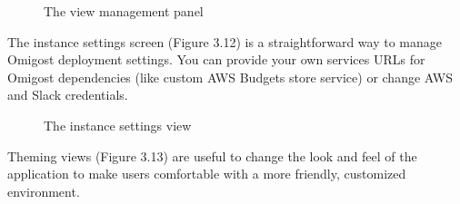 \documentclass[licencjacka,en]{thesisclass}
\begin{document}
    \begin{figure}[H]
      \caption{The view management panel\label{fig:scr-extensions}}
    \end{figure}

    The instance settings screen (Figure 3.12) is a straightforward way to manage
    Omigost deployment settings. You can provide your own services URLs for Omigost dependencies
    (like custom AWS Budgets store service) or change AWS and Slack credentials.

    \begin{figure}[H]
      \caption{The instance settings view\label{fig:scr-instance-settings}}
    \end{figure}

    Theming views (Figure 3.13) are useful to change the look and feel of the application
    to make users comfortable with a more friendly, customized environment.
\end{document}
